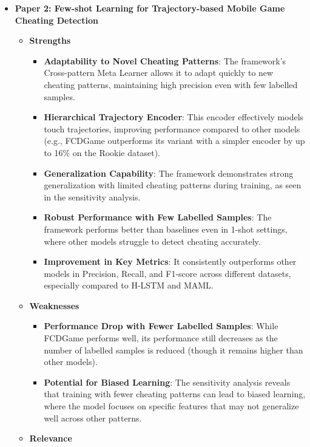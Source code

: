 \documentclass[a4paper, 12pt]{article}
\begin{document}
\begin{itemize}
\begin{itemize}
    \end{itemize}
    \item \textbf{Paper 2: Few-shot Learning for Trajectory-based Mobile Game Cheating Detection} 
    \begin{itemize}
        \item \textbf{Strengths}
        \begin{itemize}
            \item \textbf{Adaptability to Novel Cheating Patterns}: The framework’s Cross-pattern Meta Learner allows it to adapt quickly to new cheating patterns, maintaining high precision even with few labelled samples.
            \item \textbf{Hierarchical Trajectory Encoder}: This encoder effectively models touch trajectories, improving performance compared to other models (e.g., FCDGame outperforms its variant with a simpler encoder by up to 16\% on the Rookie dataset).
            \item \textbf{Generalization Capability}: The framework demonstrates strong generalization with limited cheating patterns during training, as seen in the sensitivity analysis.
            \item \textbf{Robust Performance with Few Labelled Samples}: The framework performs better than baselines even in 1-shot settings, where other models struggle to detect cheating accurately.
            \item \textbf{Improvement in Key Metrics}: It consistently outperforms other models in Precision, Recall, and F1-score across different datasets, especially compared to H-LSTM and MAML.
        \end{itemize}
        \item \textbf{Weaknesses}
        \begin{itemize}
            \item \textbf{Performance Drop with Fewer Labelled Samples}: While FCDGame performs well, its performance still decreases as the number of labelled samples is reduced (though it remains higher than other models).
            \item \textbf{Potential for Biased Learning}: The sensitivity analysis reveals that training with fewer cheating patterns can lead to biased learning, where the model focuses on specific features that may not generalize well across other patterns.
        \end{itemize}
        \item \textbf{Relevance}


\end{itemize}
\end{itemize}
\end{document}

